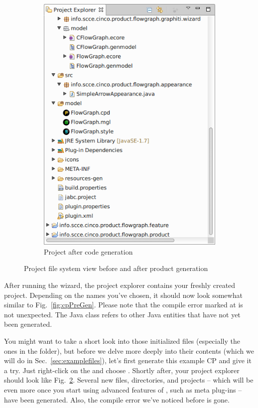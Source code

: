 \documentclass[a4paper,american,12pt]{scrreprt}
\begin{document}
\begin{figure}
\begin{subfigure}[t]{0.40\textwidth}
		\includegraphics[width=\textwidth]{screenshots/example-cp-postgen.png}
		\caption{Project after code generation}
		\label{fig:cpPostGen}
	\end{subfigure}
	\caption{Project file system view before and after \cinco{} product generation}
\end{figure}

After running the wizard, the project explorer contains your freshly created
project. Depending on the names you've chosen, it should now look somewhat
similar to Fig.~\ref{fig:cpPreGen}. Please note that the compile error marked at
 is not unexpected. The Java class refers to
other Java entities that have not yet been generated. 

You might want to take a short look into those initialized files (especially the ones in the
 folder), but before we delve more deeply
into their contents (which we will do
in Sec.~\ref{sec:examplefiles}), let's first generate this example CP and give
it a try. Just right-click on the  and
choose . Shortly after, your project explorer should
look like Fig.~\ref{fig:cpPostGen}. Several new files, directories, and
projects -- which will be even more once you start using advanced
features of \cinco{}, such as meta plug-ins -- have been generated. Also, the
compile error we've noticed before is gone. 
\end{document}
